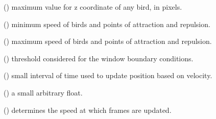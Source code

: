 \documentclass[a4paper,11pt,oneside,english]{sphinxmanual}
\begin{document}
\begin{fulllineitems}
() maximum value for z coordinate of any bird, in pixels.

\end{fulllineitems}


\bigskip 
\bigskip 


\begin{fulllineitems}
() minimum speed of birds and points of attraction and repulsion.

\end{fulllineitems}



\begin{fulllineitems}
() maximum speed of birds and points of attraction and repulsion.

\end{fulllineitems}


\bigskip 
\bigskip 


\begin{fulllineitems}
() threshold considered for the window boundary conditions.

\end{fulllineitems}



\begin{fulllineitems}
() small interval of time used to update position based on velocity.

\end{fulllineitems}



\begin{fulllineitems}
() a small arbitrary float.

\end{fulllineitems}


\bigskip 
\bigskip 


\begin{fulllineitems}
() determines the speed at which frames are updated.

\end{fulllineitems}
\end{document}
